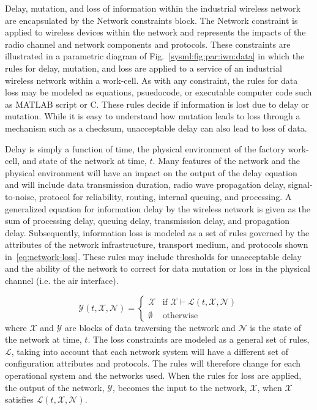 Delay, mutation, and loss of information within the industrial wireless network are encapsulated by the Network constraints block.  The Network constraint is applied to wireless devices within the network and represents the impacts of the radio channel and network components and protocols.  These constraints are illustrated in a parametric diagram of Fig.~\ref{sysml:fig:par:iwn:data} in which the rules for delay, mutation, and loss are applied to a service of an industrial wireless network within a work-cell. As with any constraint, the rules for data loss may be modeled as equations, psuedocode, or executable computer code such as MATLAB script or C.  These rules decide if information is lost due to delay or mutation.  While it is easy to understand how mutation leads to loss through a mechanism such as a checksum, unacceptable delay can also lead to loss of data.  

Delay is simply a function of time, the physical environment of the factory work-cell, and state of the network at time, $t$. Many features of the network and the physical environment will have an impact on the output of the delay equation and will include data transmission duration, radio wave propagation delay, signal-to-noise, protocol for reliability, routing, internal queuing, and processing. A generalized equation for information delay by the wireless network is given as the sum of processing delay, queuing delay, transmission delay, and propagation delay. Subsequently, information loss is modeled as a set of rules governed by the attributes of the network infrastructure, transport medium, and protocols shown in~\eqref{eq:network-loss}. These rules may include thresholds for unacceptable delay and the ability of the network to correct for data mutation or loss in the physical channel (i.e. the air interface).

\begin{equation}\label{eq:network-loss}
\mathcal{Y}(t,\mathcal{X},\mathcal{N}) = 
\begin{cases} 
\mathcal{X} & \text{if } \mathcal{X} \vdash \mathcal{L}(t,\mathcal{X},\mathcal{N}) \\
\emptyset   & \text{otherwise}
\end{cases}
\end{equation}
where $\mathcal{X}$ and $\mathcal{Y}$ are blocks of data traversing the network and $\mathcal{N}$ is the state of the network at time, $t$.	The loss constraints are modeled as a general set of rules, $\mathcal{L}$, taking into account that each network system will have a different set of configuration attributes and protocols.  The rules will therefore change for each operational system and the networks used.  When the rules for loss are applied, the output of the network, $\mathcal{Y}$, becomes the input to the network, $\mathcal{X}$, when $\mathcal{X}$ satisfies $\mathcal{L}(t,\mathcal{X},\mathcal{N})$.

